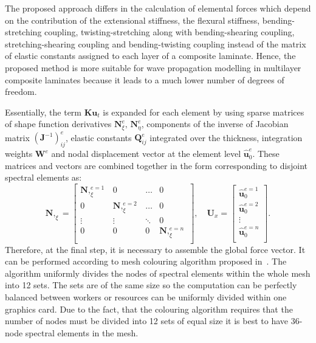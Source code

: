 \documentclass[runningheads]{llncs}
\renewcommand{\vec}[1]{\mathbf{#1}}
\newcommand{\bm}[1]{\mathbf{#1}}
\begin{document}
The proposed approach differs in the calculation of elemental forces which depend on the contribution of the extensional stiffness, the flexural stiffness, bending-stretching coupling,  twisting-stretching along with bending-shearing coupling, stre\-tching-shearing coupling and bending-twisting coupling instead of the matrix of elastic constants assigned to each layer of a composite laminate. 
Hence, the proposed method is more suitable for wave propagation modelling in multilayer composite laminates because it leads to a much lower number of degrees of freedom. 

Essentially, the term \(\bm{K}\vec{u}_t\) is expanded for each element by using sparse matrices of shape function derivatives \(\bm{N}_{\xi}^e,\,\bm{N}_{\eta}^e\), components of the inverse of Jacobian matrix \((\vec{J}^{-1})_{ij}^e\), elastic constants \(\vec{Q}_{ij}^e\) integrated over the thickness, integration weights \(\vec{W}^e\) and nodal displacement vector at the element level \(\hat{\vec{u}}_0^{e} \). 
These matrices and vectors are combined together in the form corresponding to disjoint spectral elements as:
\begin{equation}
\bm{N},_{\xi} = \left[
\begin{array}{cccc}  
\bm{N},_{\xi}^{e=1} & 0 & \ldots & 0\\[2pt]
0& \bm{N},_{\xi}^{e=2}  & \ldots& 0\\[2pt]
\vdots&\vdots&\ddots&0\\[2pt]
0& 0 &0&\bm{N},_{\xi}^{e=n}\\[2pt]
\end{array}\right],\quad
\vec{U}_x = \left[
\begin{array}{c}  
\hat{\vec{u}}_0^{e=1}  \\[2pt]
\hat{\vec{u}}_0^{e=2} \\[2pt]
\vdots\\[2pt]
\hat{\vec{u}}_0^{e=n}\\[2pt]
\end{array}\right].
\end{equation}
Therefore, at the final step, it is necessary to assemble the global force vector. 
It can be performed according to mesh colouring algorithm proposed in~\cite{Kudela2016}. 
The algorithm uniformly divides the nodes of spectral elements within the whole mesh into 12 sets. 
The sets are of the same size so the computation can be perfectly balanced between workers or resources can be uniformly divided within one graphics card.
Due to the fact, that the colouring algorithm requires that the number of nodes must be divided into 12 sets of equal size it is best to have 36-node spectral elements in the mesh.
\end{document}
